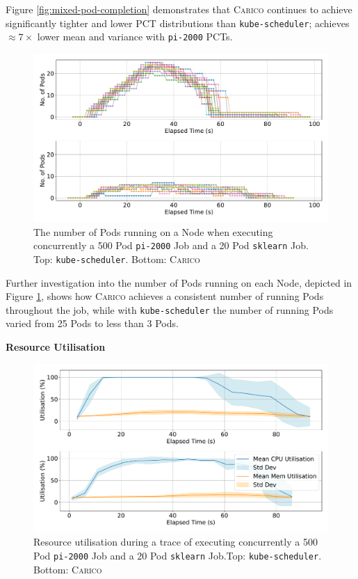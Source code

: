 Figure \ref{fig:mixed-pod-completion} demonstrates that \textsc{Carico}
continues to achieve significantly tighter and lower PCT distributions than
\texttt{kube-scheduler}; achieves $\approx 7 \times$ lower mean and variance with
\texttt{pi-2000} PCTs.


\begin{figure}[ht!]
    \centering
    \includegraphics[width=\textwidth]{images/mixed-running-pods.pdf}
    \caption{The number of Pods running on a Node when executing concurrently a
    500 Pod \texttt{pi-2000} Job and a 20 Pod \texttt{sklearn} Job. Top:
    \texttt{kube-scheduler}. Bottom: \textsc{Carico}}
    \label{fig:mixed-pod-running}
\end{figure}

Further investigation into the number of Pods running on each Node, depicted in
Figure \ref{fig:mixed-pod-running}, shows how \textsc{Carico} achieves a
consistent number of running Pods throughout the job, while with
\texttt{kube-scheduler} the number of running Pods varied from 25 Pods to less
than 3 Pods.

\textbf{Resource Utilisation}\\
\begin{figure}[ht!]
    \centering
    \includegraphics[width=\textwidth]{images/mixed-util.pdf}
    \caption{Resource utilisation during a trace of executing concurrently a 500
    Pod \texttt{pi-2000} Job and a 20 Pod \texttt{sklearn} Job.Top:
    \texttt{kube-scheduler}. Bottom: \textsc{Carico}}
    \label{fig:mixed-util}
\end{figure}

